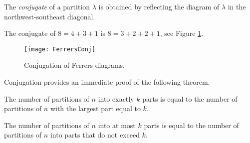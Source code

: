 \begin{page}
\setcounter{section}{3}
\setcounter{subsection}{6}
\setcounter{dfn}{13}
\label{portion:927}

\begin{dfn}
The \emph{conjugate} of a partition $\lambda$ is
obtained by reflecting the diagram of $\lambda$ in the northwest-southeast diagonal.
\end{dfn}

\end{page}

\begin{page}
\setcounter{section}{3}
\setcounter{subsection}{6}
\setcounter{dfn}{14}
\label{portion:930}

\begin{exl}
The conjugate of $8 = 4 + 3 + 1$ is $8 = 3 + 2 + 2 + 1$, see Figure \ref{fig:FerrersConj}.
\end{exl}

\end{page}

\begin{page}
\setcounter{section}{3}
\setcounter{subsection}{6}
\setcounter{dfn}{14}
\label{portion:931}


\begin{figure}[ht]
\begin{center}
\texttt{[image: FerrersConj]}
\end{center}
\caption{Conjugation of Ferrers diagrams.}
\label{fig:FerrersConj}
\end{figure}

Conjugation provides an immediate proof of the following theorem.


\end{page}

\begin{page}
\setcounter{section}{3}
\setcounter{subsection}{6}
\setcounter{dfn}{15}
\label{portion:933}

\begin{thm}
\label{thm:RestrPart}
The number of partitions of $n$ into exactly $k$ parts is equal to the number of partitions of $n$ with the largest part equal to $k$.

The number of partitions of $n$ into at most $k$ parts is equal to the number of partitions of $n$ into parts that do not exceed $k$.
\end{thm}

\end{page}

